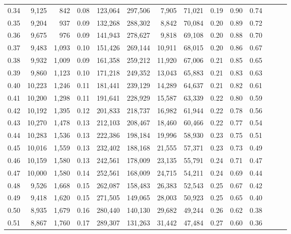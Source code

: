 \begin{tabular}{rrrrrrrrrrrrrr}
0.34 &   9,125 &    842 &  0.08 &  123,064 &  297,506 &   7,905 &  71,021 &  0.19 &  0.90 &      0.74 \\
0.35 &   9,204 &    937 &  0.09 &  132,268 &  288,302 &   8,842 &  70,084 &  0.20 &  0.89 &      0.72 \\
0.36 &   9,675 &    976 &  0.09 &  141,943 &  278,627 &   9,818 &  69,108 &  0.20 &  0.88 &      0.70 \\
0.37 &   9,483 &  1,093 &  0.10 &  151,426 &  269,144 &  10,911 &  68,015 &  0.20 &  0.86 &      0.67 \\
0.38 &   9,932 &  1,009 &  0.09 &  161,358 &  259,212 &  11,920 &  67,006 &  0.21 &  0.85 &      0.65 \\
0.39 &   9,860 &  1,123 &  0.10 &  171,218 &  249,352 &  13,043 &  65,883 &  0.21 &  0.83 &      0.63 \\
0.40 &  10,223 &  1,246 &  0.11 &  181,441 &  239,129 &  14,289 &  64,637 &  0.21 &  0.82 &      0.61 \\
0.41 &  10,200 &  1,298 &  0.11 &  191,641 &  228,929 &  15,587 &  63,339 &  0.22 &  0.80 &      0.59 \\
0.42 &  10,192 &  1,395 &  0.12 &  201,833 &  218,737 &  16,982 &  61,944 &  0.22 &  0.78 &      0.56 \\
0.43 &  10,270 &  1,478 &  0.13 &  212,103 &  208,467 &  18,460 &  60,466 &  0.22 &  0.77 &      0.54 \\
0.44 &  10,283 &  1,536 &  0.13 &  222,386 &  198,184 &  19,996 &  58,930 &  0.23 &  0.75 &      0.51 \\
0.45 &  10,016 &  1,559 &  0.13 &  232,402 &  188,168 &  21,555 &  57,371 &  0.23 &  0.73 &      0.49 \\
0.46 &  10,159 &  1,580 &  0.13 &  242,561 &  178,009 &  23,135 &  55,791 &  0.24 &  0.71 &      0.47 \\
0.47 &  10,000 &  1,580 &  0.14 &  252,561 &  168,009 &  24,715 &  54,211 &  0.24 &  0.69 &      0.44 \\
0.48 &   9,526 &  1,668 &  0.15 &  262,087 &  158,483 &  26,383 &  52,543 &  0.25 &  0.67 &      0.42 \\
0.49 &   9,418 &  1,620 &  0.15 &  271,505 &  149,065 &  28,003 &  50,923 &  0.25 &  0.65 &      0.40 \\
0.50 &   8,935 &  1,679 &  0.16 &  280,440 &  140,130 &  29,682 &  49,244 &  0.26 &  0.62 &      0.38 \\
0.51 &   8,867 &  1,760 &  0.17 &  289,307 &  131,263 &  31,442 &  47,484 &  0.27 &  0.60 &      0.36 \\

\end{tabular}
